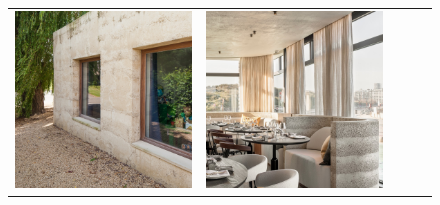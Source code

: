 \begin{figure}[H]
{\begin{tabular}{@{}ccccc@{}}
      \includegraphics[width=\linewidth]{Images/LoRAs/STAMPBETON/Training_images/11.jpg} &
      \includegraphics[width=\linewidth]{Images/LoRAs/STAMPBETON/Training_images/12.jpg} &

\end{tabular}}
\end{figure}
